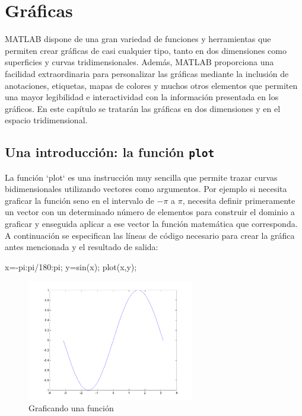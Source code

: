 \chapter{Gráficas}

MATLAB dispone de una gran variedad de funciones y herramientas que
permiten crear gráficas de casi cualquier tipo, tanto en dos dimensiones
como superficies y curvas tridimensionales. Además, MATLAB proporciona
una facilidad extraordinaria para personalizar las gráficas mediante la
inclusión de anotaciones, etiquetas, mapas de colores y muchos otros
elementos que permiten una mayor legibilidad e interactividad con la
información presentada en los gráficos. En este capítulo se tratarán las
gráficas en dos dimensiones y en el espacio tridimensional.

\section{Una introducción: la función \texttt{plot}}

La función `plot` es una instrucción muy sencilla que permite 
trazar curvas bidimensionales utilizando vectores como argumentos. Por
ejemplo si necesita graficar la función seno en el intervalo de
$-\pi$ a $\pi$, necesita definir primeramente un
vector con un determinado número de elementos para construir el dominio
a graficar y enseguida aplicar a ese vector la función matemática que
corresponda. A continuación se especifican las líneas de código
necesario para crear la gráfica antes mencionada y el resultado de
salida:

\begin{matlab}
x=-pi:pi/180:pi;
y=sin(x);
plot(x,y);
\end{matlab}


\begin{figure}[htbp]
    \centering
    \includegraphics[width=0.65\textwidth]{src/img/ch4/img_4_1.png}
    \caption{Graficando una función}
    \label{fig:img_4_1}
\end{figure}



